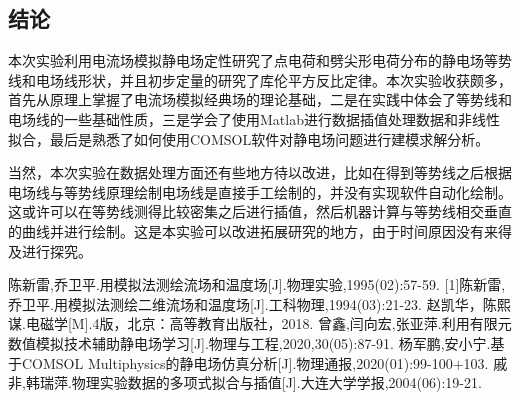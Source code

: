 \documentclass{WHUReport}
\begin{document}
\begin{multicols}{2}
	\section{结\quad 论}
	本次实验利用电流场模拟静电场定性研究了点电荷和劈尖形电荷分布的静电场等势线和电场线形状，并且初步定量的研究了库伦平方反比定律。本次实验收获颇多，首先从原理上掌握了电流场模拟经典场的理论基础，二是在实践中体会了等势线和电场线的一些基础性质，三是学会了使用Matlab进行数据插值处理数据和非线性拟合，最后是熟悉了如何使用COMSOL软件对静电场问题进行建模求解分析。
	
	当然，本次实验在数据处理方面还有些地方待以改进，比如在得到等势线之后根据电场线与等势线原理绘制电场线是直接手工绘制的，并没有实现软件自动化绘制。这或许可以在等势线测得比较密集之后进行插值，然后机器计算与等势线相交垂直的曲线并进行绘制。这是本实验可以改进拓展研究的地方，由于时间原因没有来得及进行探究。
	
	\begin{thebibliography}{99}  
		陈新雷,乔卫平.用模拟法测绘流场和温度场[J].物理实验,1995(02):57-59.
		[1]陈新雷,乔卫平.用模拟法测绘二维流场和温度场[J].工科物理,1994(03):21-23.
		赵凯华，陈熙谋.电磁学[M].4版，北京：高等教育出版社，2018.
		曾鑫,闫向宏,张亚萍.利用有限元数值模拟技术辅助静电场学习[J].物理与工程,2020,30(05):87-91.
		杨军鹏,安小宁.基于COMSOL Multiphysics的静电场仿真分析[J].物理通报,2020(01):99-100+103.
		戚非,韩瑞萍.物理实验数据的多项式拟合与插值[J].大连大学学报,2004(06):19-21.
	\end{thebibliography}
\end{multicols}
\end{document}
